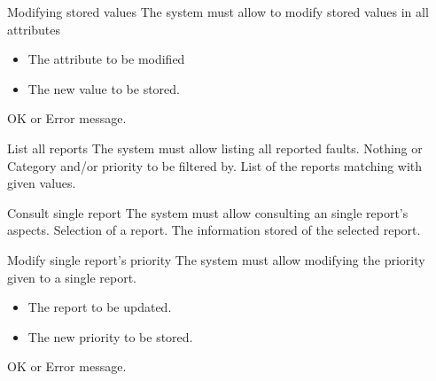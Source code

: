\begin{requirement}{Modifying stored values}
\reqdesc The system must allow to modify stored values in all attributes
\reqin
\begin{itemize}
\item The attribute to be modified 
\item The new value to be stored.
\end{itemize}

\reqout OK or Error message.
\end{requirement}


\begin{requirement}{List all reports}
\reqdesc The system must allow listing all reported faults.
\reqin Nothing or Category and/or priority to be filtered by.
\reqout List of the reports matching with given values.
\end{requirement}

\begin{requirement}{Consult single report}
\reqdesc The system must allow consulting an single report's aspects.
\reqin Selection of a report.
\reqout The information stored of the selected report.
\end{requirement}

\begin{requirement}{Modify single report's priority}
\reqdesc The system must allow modifying the priority given to a single report.
\reqin \begin{itemize}
\item The report to be updated.
\item The new priority to be stored.
\end{itemize}
\reqout OK or Error message.

\end{requirement}




